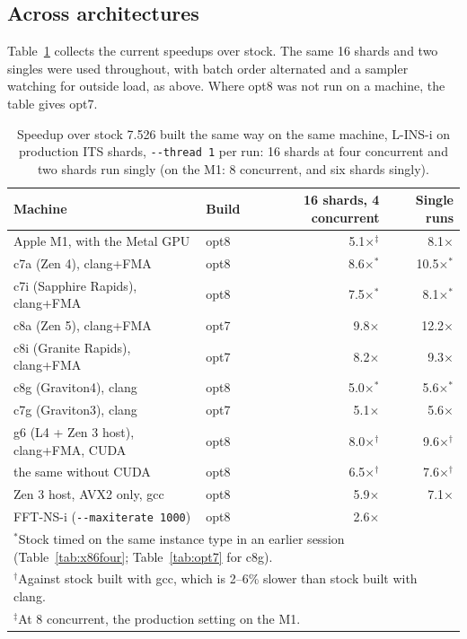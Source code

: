 \documentclass[11pt]{article}
\newcommand{\code}[1]{\texttt{#1}}
\begin{document}
\subsection{Across architectures}
\label{sec:allarch}

Table~\ref{tab:allarch} collects the current speedups over stock. The same 16 shards and two
singles were used throughout, with batch order alternated and a sampler watching for outside
load, as above. Where opt8 was not run on a machine, the table gives opt7.

\begin{table}[h]
\centering
\caption{Speedup over stock 7.526 built the same way on the same machine, L-INS-i on production
ITS shards, \code{-{}-thread 1} per run: 16 shards at four concurrent and two shards run singly
(on the M1: 8 concurrent, and six shards singly).}
\label{tab:allarch}
\begin{tabular}{llrr}
\toprule
Machine & Build & 16 shards, 4 concurrent & Single runs \\
\midrule
Apple M1, with the Metal GPU & opt8 & 5.1$\times$$^\ddagger$ & 8.1$\times$ \\
c7a (Zen 4), clang+FMA & opt8 & 8.6$\times$$^*$ & 10.5$\times$$^*$ \\
c7i (Sapphire Rapids), clang+FMA & opt8 & 7.5$\times$$^*$ & 8.1$\times$$^*$ \\
c8a (Zen 5), clang+FMA & opt7 & 9.8$\times$ & 12.2$\times$ \\
c8i (Granite Rapids), clang+FMA & opt7 & 8.2$\times$ & 9.3$\times$ \\
c8g (Graviton4), clang & opt8 & 5.0$\times$$^*$ & 5.6$\times$$^*$ \\
c7g (Graviton3), clang & opt7 & 5.1$\times$ & 5.6$\times$ \\
g6 (L4 + Zen 3 host), clang+FMA, CUDA & opt8 & 8.0$\times$$^\dagger$ & 9.6$\times$$^\dagger$ \\
\quad the same without CUDA & opt8 & 6.5$\times$$^\dagger$ & 7.6$\times$$^\dagger$ \\
Zen 3 host, AVX2 only, gcc & opt8 & 5.9$\times$ & 7.1$\times$ \\
\quad FFT-NS-i (\code{-{}-maxiterate 1000}) & opt8 & 2.6$\times$ & \\
\bottomrule
\multicolumn{4}{l}{\footnotesize $^*$Stock timed on the same instance type in an earlier session (Table~\ref{tab:x86four}; Table~\ref{tab:opt7} for c8g).}\\
\multicolumn{4}{l}{\footnotesize $^\dagger$Against stock built with gcc, which is 2--6\% slower than stock built with clang.}\\
\multicolumn{4}{l}{\footnotesize $^\ddagger$At 8 concurrent, the production setting on the M1.}
\end{tabular}
\end{table}
\end{document}
